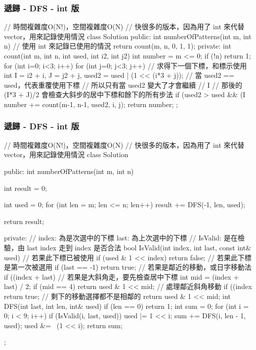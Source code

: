 \subsubsection{遞歸 - DFS - int 版}
\begin{Code}
// 時間複雜度O(N!)，空間複雜度O(N)
// 快很多的版本，因為用了 int 來代替 vector，用來記錄使用情況
class Solution {
public:
    int numberOfPatterns(int m, int n) {
        // 使用 int 來記錄已使用的情況
        return count(m, n, 0, 1, 1);
    }
private:
    int count(int m, int n, int used, int i2, int j2) {
        int number = m <= 0;
        if (!n) return 1;
        for (int i=0; i<3; i++) {
            for (int j=0; j<3; j++) {
                // 求得下一個下標，和標示使用
                int I = i2 + i, J = j2 + j, used2 = used | (1 << (i*3 + j));
                // 當 used2 == used，代表重覆使用下標
                // 所以只有當 used2 變大了才會繼續
                // I %
                // 那後的 (I*3 + J)/2 會檢查大斜步的居中下標和餘下的所有步法
                if (used2 > used && (I %
                    number += count(m-1, n-1, used2, i, j);
            }
        }
        return number;
    }
};
\end{Code}

\subsubsection{遞歸 - DFS - int 版}
\begin{Code}
// 時間複雜度O(N!)，空間複雜度O(N)
// 快很多的版本，因為用了 int 來代替 vector，用來記錄使用情況
class Solution {
public:
    int numberOfPatterns(int m, int n) {
        int result = 0;

        int used = 0;
        for (int len = m; len <= n; len++)
            result += DFS(-1, len, used);

        return result;
    }
private:
    // index: 為是次選中的下標 last: 為上次選中的下標
    // IsValid: 是在檢驗，由 last index 走到 index 是否合法
    bool IsValid(int index, int last, const int& used)
    {
        // 若果此下標已被使用
        if (used & 1 << index) return false;
        // 若果此下標是第一次被選用
        if (last == -1) return true;
        // 若果是鄰近的移動，或日字移動法
        if ((index + last) %
        // 若果是大斜角走，要先檢查居中下標
        int mid = (index + last) / 2;
        if (mid == 4) return used & 1 << mid;
        // 處理鄰近斜角移動
        if ((index %
            return true;
        // 剩下的移動選擇都不是相鄰的
        return used & 1 << mid;
    }
    int DFS(int last, int len, int& used)
    {
        if (len == 0)
            return 1;
        int sum = 0;
        for (int i = 0; i < 9; i++)
        {
            if (IsValid(i, last, used))
            {
                used |= 1 << i;
                sum += DFS(i, len - 1, used);
                used &= ~(1 << i);
            }
        }
        return sum;
    }
};
\end{Code}

